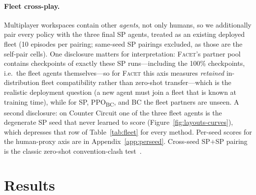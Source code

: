 \documentclass[11pt]{article}
\newcommand{\facet}{\textsc{Facet}}
\newcommand{\hproxy}{$H_{\text{proxy}}$}
\newcommand{\ppobc}{PPO\textsubscript{BC}}
\begin{document}
\paragraph{Fleet cross-play.}
Multiplayer workspaces contain other \emph{agents}, not only humans, so we
additionally pair every policy with the three final SP agents, treated as
an existing deployed fleet (10 episodes per pairing; same-seed SP pairings
excluded, as those are the self-pair cells). One disclosure matters for
interpretation: \facet{}'s partner pool contains checkpoints of exactly
these SP runs---including the 100\% checkpoints, i.e.\ the fleet agents
themselves---so for \facet{} this axis measures \emph{retained}
in-distribution fleet compatibility rather than zero-shot transfer---which
is the realistic deployment question (a new agent must join a fleet that is
known at training time), while for SP, \ppobc{}, and BC the fleet partners
are unseen. A second disclosure: on Counter Circuit one of the three fleet
agents is the degenerate SP seed that never learned to score
(Figure~\ref{fig:layouts-curves}), which depresses that row of
Table~\ref{tab:fleet} for every method. Per-seed scores for the human-proxy
axis are in Appendix~\ref{app:perseed}. Cross-seed SP$+$SP pairing is the classic zero-shot
convention-clash test~\citep{hu2020otherplay}.

\section{Results}
\label{sec:results}

\begin{table}[t]
\centering
\caption{Mean episode score (delivered diamonds $\times$ 20, horizon 400)
when paired
with held-out human proxies (\hproxy{}), and when paired with self.
Mean $\pm$ s.e.\ over 3 training seeds (90 evaluation episodes per
\hproxy{} cell, 30 per self cell). \emph{HH} = mean score of the real
human--human test games, rate-normalized from $\approx$1{,}190-step games
to the 400-step horizon (a reference, not an upper bound). Bold = best
with \hproxy{} per layout, plus any method whose $\pm$1~s.e.\ interval
overlaps the best's.}
\label{tab:main}
\small

\end{table}

\begin{table}[t]
\centering
\caption{Fleet cross-play: mean episode score when paired with the three
final SP agents (10 episodes per pairing; mean $\pm$ s.e.\ over 3 agent
seeds; same-seed SP pairings excluded). \facet{}'s pool contained these
runs' checkpoints (retained compatibility); for the other methods the fleet
is unseen. Bold = best per layout, plus any method whose $\pm$1~s.e.\
interval overlaps the best's.}
\label{tab:fleet}
\small

\end{table}
\end{document}
